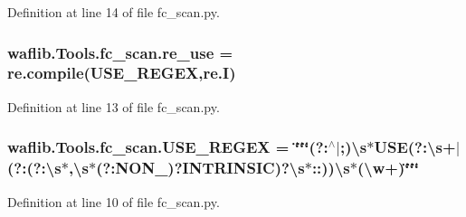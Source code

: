 Definition at line 14 of file fc\+\_\+scan.\+py.

\subsubsection[{\texorpdfstring{re\+\_\+use}{re_use}}]{\setlength{\rightskip}{0pt plus 5cm}waflib.\+Tools.\+fc\+\_\+scan.\+re\+\_\+use = re.\+compile({\bf U\+S\+E\+\_\+\+R\+E\+G\+EX},re.\+I)}\hypertarget{namespacewaflib_1_1_tools_1_1fc__scan_a9043d572c800bcbb048a13407bb5141f}{}\label{namespacewaflib_1_1_tools_1_1fc__scan_a9043d572c800bcbb048a13407bb5141f}


Definition at line 13 of file fc\+\_\+scan.\+py.

\subsubsection[{\texorpdfstring{U\+S\+E\+\_\+\+R\+E\+G\+EX}{USE_REGEX}}]{ waflib.\+Tools.\+fc\+\_\+scan.\+U\+S\+E\+\_\+\+R\+E\+G\+EX = \char`\"{}\char`\"{}\char`\"{}(?\+:$^\wedge$$\vert$;)\textbackslash{}s$\ast$U\+SE(?\+:\textbackslash{}{\bf s}+$\vert$(?\+:(?\+:\textbackslash{}{\bf s}$\ast$,\textbackslash{}{\bf s}$\ast$(?\+:N\+O\+N\+\_\+)?I\+N\+T\+R\+I\+N\+S\+IC)?\textbackslash{}{\bf s}$\ast$\+::))\textbackslash{}{\bf s}$\ast$(\textbackslash{}w+)\char`\"{}\char`\"{}\char`\"{}}\hypertarget{namespacewaflib_1_1_tools_1_1fc__scan_a7c5bb532a0b53496b1ff8b1fb781036d}{}\label{namespacewaflib_1_1_tools_1_1fc__scan_a7c5bb532a0b53496b1ff8b1fb781036d}


Definition at line 10 of file fc\+\_\+scan.\+py.

